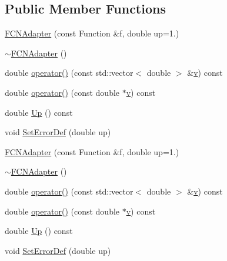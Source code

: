 \subsection*{Public Member Functions}
\begin{DoxyCompactItemize}
\item 
\mbox{\hyperlink{classROOT_1_1Minuit2_1_1FCNAdapter_a0cd70aee01a37c53792062b4118588dc}{F\+C\+N\+Adapter}} (const Function \&f, double up=1.)
\item 
\mbox{\hyperlink{classROOT_1_1Minuit2_1_1FCNAdapter_a6d8b1c24b52ec333fca9cc854533a777}{$\sim$\+F\+C\+N\+Adapter}} ()
\item 
double \mbox{\hyperlink{classROOT_1_1Minuit2_1_1FCNAdapter_a3d400764a6828594b68a00b905d450b2}{operator()}} (const std\+::vector$<$ double $>$ \&\mbox{\hyperlink{hadron__timeslice_8cc_a716fc87f5e814be3ceee2405ed6ff22a}{v}}) const
\item 
double \mbox{\hyperlink{classROOT_1_1Minuit2_1_1FCNAdapter_a9321402d626f4bdfbdbef3b63d452daf}{operator()}} (const double $\ast$\mbox{\hyperlink{hadron__timeslice_8cc_a716fc87f5e814be3ceee2405ed6ff22a}{v}}) const
\item 
double \mbox{\hyperlink{classROOT_1_1Minuit2_1_1FCNAdapter_a3bcb29efda3b97c17bb17512c1629365}{Up}} () const
\item 
void \mbox{\hyperlink{classROOT_1_1Minuit2_1_1FCNAdapter_ad87419db3f1d4764497f52487fef6fc8}{Set\+Error\+Def}} (double up)
\item 
\mbox{\hyperlink{classROOT_1_1Minuit2_1_1FCNAdapter_a0cd70aee01a37c53792062b4118588dc}{F\+C\+N\+Adapter}} (const Function \&f, double up=1.)
\item 
\mbox{\hyperlink{classROOT_1_1Minuit2_1_1FCNAdapter_a6d8b1c24b52ec333fca9cc854533a777}{$\sim$\+F\+C\+N\+Adapter}} ()
\item 
double \mbox{\hyperlink{classROOT_1_1Minuit2_1_1FCNAdapter_a3d400764a6828594b68a00b905d450b2}{operator()}} (const std\+::vector$<$ double $>$ \&\mbox{\hyperlink{hadron__timeslice_8cc_a716fc87f5e814be3ceee2405ed6ff22a}{v}}) const
\item 
double \mbox{\hyperlink{classROOT_1_1Minuit2_1_1FCNAdapter_a9321402d626f4bdfbdbef3b63d452daf}{operator()}} (const double $\ast$\mbox{\hyperlink{hadron__timeslice_8cc_a716fc87f5e814be3ceee2405ed6ff22a}{v}}) const
\item 
double \mbox{\hyperlink{classROOT_1_1Minuit2_1_1FCNAdapter_a3bcb29efda3b97c17bb17512c1629365}{Up}} () const
\item 
void \mbox{\hyperlink{classROOT_1_1Minuit2_1_1FCNAdapter_ad87419db3f1d4764497f52487fef6fc8}{Set\+Error\+Def}} (double up)
\end{DoxyCompactItemize}


